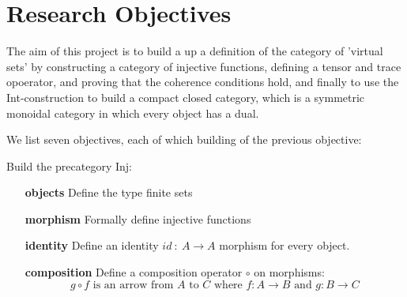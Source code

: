 \section{Research Objectives}

The aim of this project is to build a up a definition of the category of 'virtual
sets' by constructing a category of injective functions, defining a tensor and
trace opoerator, and proving that the coherence conditions hold, and finally to
use the \textrm{Int}-construction to build a compact closed category, which is a
symmetric monoidal category in which every object has a dual.

We list seven objectives, each of which building of the previous objective: 

\begin{objective} \label{obj:precategory}
  Build the precategory \cite{maclane1998-categories-book} \textrm{Inj}:
  \begin{itemize}
  \item[\textbf{objects}] Define the type finite sets
  \item[\textbf{morphism}] Formally define injective functions
  \item[\textbf{identity}] Define an identity $\mathit{id}\ :\ A \to A$ morphism for every object.
  \item[\textbf{composition}] Define a composition operator $\circ$ on morphisms:
    $$
    g \circ f \text{ is an arrow from $A$ to $C$ where } f : A \to B \text{ and } g : B \to C
    $$
  \end{itemize}
\end{objective}
